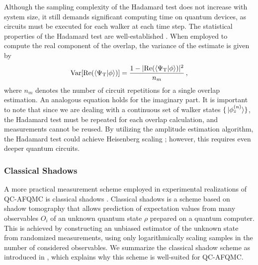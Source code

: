 \documentclass[../main.tex]{subfiles}
\begin{document}
Although the sampling complexity of the Hadamard test does not increase with system size, it still demands significant computing time on quantum devices, as circuits must be executed for each walker at each time step.
The statistical properties of the Hadamard test are well-established \cite{polla2023optimizing}. When employed to compute the real component of the overlap, the variance of the estimate is given by
\begin{align}
    \mathrm{Var}[\mathrm{Re}(\braket{\Psi_\mathrm{T}}{\phi})] = \frac{1-|\mathrm{Re}(\braket{\Psi_\mathrm{T}}{\phi})|^2}{n_m}\,,
\end{align}
where  $n_m$ denotes the number of circuit repetitions for a single overlap estimation. An analogous equation holds for the imaginary part.
It is important to note that since we are dealing with a continuous set of walker states $\{\ket*{\phi^{(n)}_z}\}$, the Hadamard test must be repeated for each overlap calculation, and measurements cannot be reused. By utilizing the amplitude estimation algorithm, the Hadamard test could achieve Heisenberg scaling \cite{brassard2002quantum, lin2022lecture}; however, this requires even deeper quantum circuits.

\subsubsection{Classical Shadows}\label{sec:classicalshadows}

A more practical measurement scheme employed in experimental realizations of QC-AFQMC is classical shadows  \cite{huggins2022unbiasing, huang2020predicting}. Classical shadows is a scheme based on shadow tomography  \cite{aaronson2017shadow} that allows prediction of expectation values from many observables ${O_i}$ of an unknown quantum state $\rho$ prepared on a quantum computer. This is achieved by constructing an unbiased estimator of the unknown state from randomized measurements, using only logarithmically scaling samples in the number of considered observables. We summarize the classical shadow scheme as introduced in \cite{huang2020predicting}, which explains why this scheme is well-suited for QC-AFQMC.
\end{document}
